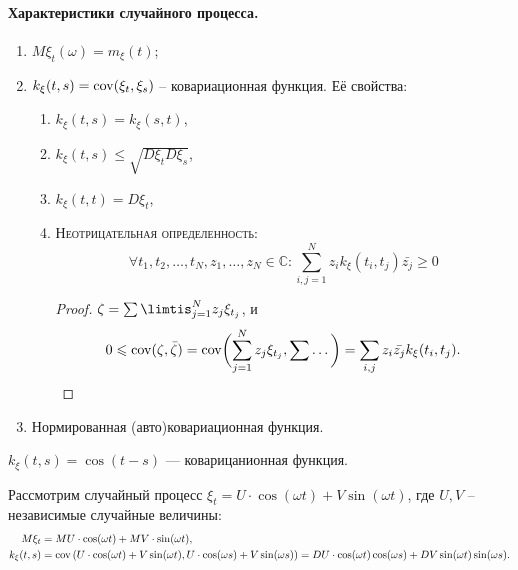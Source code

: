 \paragraph{Характеристики случайного процесса.}
\begin{enumerate}
  \item $M\xi_t(\omega) = m_\xi(t)$;
  \item $k_\xi (t, s) = \operatorname{cov}(\xi_t, \xi_s)$ -- ковариационная функция.
    Её свойства:
    \begin{enumerate}
      \item $k_\xi (t, s) = k_\xi (s, t)$,
      \item $k_\xi (t, s) \leqslant \sqrt{D\xi_t D\xi_s}$,
      \item $k_\xi(t, t) = D\xi_t$,
      \item \textsc{Неотрицательная определенность}:
        \[
          \forall t_1, t_2, \dots, t_N, z_1, \dots, z_N \in \mathbb{C} : \sum_{i, j = 1}^N z_i k_\xi(t_i, t_j) \bar{z_j} \geqslant 0
        \]
        \begin{proof}
          $\zeta = \sum\limtis_{j=1}^N z_j \xi_{t_j}$, и
          \[
            0 \leqslant \operatorname{cov}(\zeta, \bar{\zeta}) = \operatorname{cov}\biggl(\sum_{j=1}^N z_j
            \xi_{t_j}, \sum \dots\biggr) = \sum_{i, j} z_i \bar{z_j} k_\xi(t_i, t_j).
          \]
        \end{proof}
    \end{enumerate}
  \item Нормированная (авто)ковариационная функция.
\end{enumerate}

\begin{ex}
  $k_\xi(t, s) = \cos(t-s)$ --- коварицанионная функция.
\end{ex}

\begin{ex}
  Рассмотрим случайный процесс $\xi_t = U \cdot \cos(\omega t) + V \sin(\omega t)$,
  где $U, V$ -- независимые случайные величины:
  \begin{align*}
    M\xi_t &= MU \cdot \cos(\omega t) + MV \cdot \sin(\omega t), \\
    k_{\xi}(t, s)
           &= \operatorname{cov} \left( U \cdot \cos(\omega t) + V \sin(\omega t), U \cdot \cos(\omega s) + V \sin(\omega s) \right) 
    = DU \cdot \cos(\omega t) \cos(\omega s) + DV \sin(\omega t) \sin(\omega s).
  \end{align*}
\end{ex}


